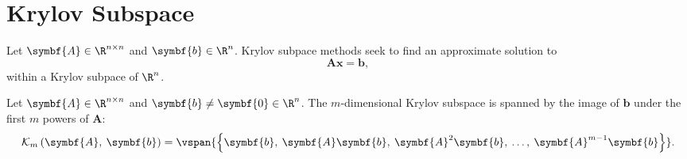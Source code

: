 \documentclass{article}
\begin{document}
\section{Krylov Subspace}
Let \(\symbf{A} \in \R^{n \times n}\) and \(\symbf{b} \in \R^n\).
Krylov subpace methods seek to find an approximate solution to
\begin{equation*}
    \symbf{A} \symbf{x} = \symbf{b},
\end{equation*}
within a Krylov subpace of \(\R^n\).
\begin{definition}
    Let \(\symbf{A} \in \R^{n \times n}\) and \(\symbf{b} \neq \symbf{0} \in \R^n\).
    The \(m\)-dimensional Krylov subspace is spanned by the image of
    \(\symbf{b}\) under the first \(m\) powers of \(\symbf{A}\):
    \begin{equation*}
        \mathcal{K}_m\left( \symbf{A},\: \symbf{b} \right) = \vspan{\left\{ \symbf{b},\: \symbf{A}\symbf{b},\: \symbf{A}^2\symbf{b},\: \ldots,\: \symbf{A}^{m-1}\symbf{b} \right\}}.
    \end{equation*}
\end{definition}
\end{document}
